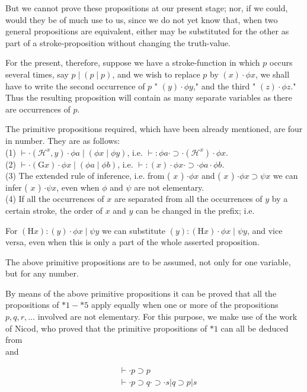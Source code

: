 \documentclass[10pt]{article}
\begin{document}
But we cannot prove these propositions at our present stage; nor, if we could, would they be of much use to us, since we do not yet know that, when two general propositions are equivalent, either may be substituted for the other as part of a stroke-proposition without changing the truth-value.

For the present, therefore, suppose we have a stroke-function in which $p$ occurs several times, say $p \mid(p \mid p)$, and we wish to replace $p$ by $(x) \cdot \phi x$, we shall have to write the second occurrence of $p$ " $(y) \cdot \phi y$," and the third " $(z) \cdot \phi z$." Thus the resulting proposition will contain as many separate variables as there are occurrences of $p$.

The primitive propositions required, which have been already mentioned, are four in number. They are as follows:\\
(1) $\vdash \cdot\left(\mathcal{H}^{x}, y\right) \cdot \phi a \mid(\phi x \mid \phi y)$, i.e. $\vdash: \phi a \cdot \supset \cdot\left(\mathcal{H}^{x}\right) \cdot \phi x$.\\
(2) $\vdash \cdot(\mathrm{G} x) \cdot \phi x \mid(\phi a \mid \phi b)$, i.e. $\vdash:(x) \cdot \phi x \cdot \supset \cdot \phi a \cdot \phi b$.\\
(3) The extended rule of inference, i.e. from ( $x$ ) $\cdot \phi x$ and ( $x$ ) $\cdot \phi x \supset \psi x$ we can infer ( $x$ ) $\cdot \psi x$, even when $\phi$ and $\psi$ are not elementary.\\
(4) If all the occurrences of $x$ are separated from all the occurrences of $y$ by a certain stroke, the order of $x$ and $y$ can be changed in the prefix; i.e.

For $(\mathrm{H} x):(y) \cdot \phi x \mid \psi y$ we can substitute $(y):(\mathrm{H} x) \cdot \phi x \mid \psi y$, and vice versa, even when this is only a part of the whole asserted proposition.

The above primitive propositions are to be assumed, not only for one variable, but for any number.

By means of the above primitive propositions it can be proved that all the propositions of $* 1-* 5$ apply equally when one or more of the propositions $p, q, r, \ldots$ involved are not elementary. For this purpose, we make use of the work of Nicod, who proved that the primitive propositions of $* 1$ can all be deduced from\\
and

$$
\begin{aligned}
& \vdash \cdot p \supset p \\
& \vdash \cdot p \supset q \cdot \supset \cdot s|q \supset p| s
\end{aligned}
$$
\end{document}
